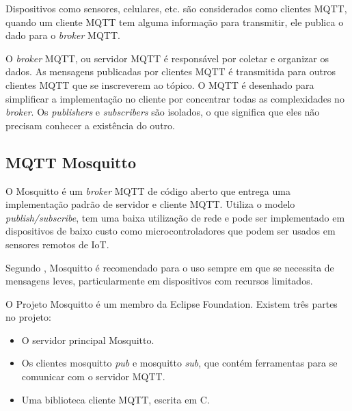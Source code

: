 Dispositivos como sensores, celulares, etc. são considerados como clientes MQTT, quando um cliente MQTT tem alguma informação para transmitir, ele publica o dado para o \textit {broker} MQTT.

O \textit {broker} MQTT, ou servidor MQTT é responsável por coletar e organizar os dados. As mensagens publicadas por clientes MQTT é transmitida para outros clientes MQTT que se inscreverem ao tópico. O MQTT é desenhado para simplificar a implementação no cliente por concentrar todas as complexidades no \textit {broker}. Os \textit {publishers} e \textit {subscribers} são isolados, o que significa que eles não precisam conhecer a existência do outro.

\subsection{MQTT Mosquitto}

O Mosquitto é um \textit{broker} MQTT de código aberto \cite{Kodali2017} que entrega uma implementação padrão de servidor e cliente MQTT. Utiliza o modelo \textit{publish/subscribe}, tem uma baixa utilização de rede e pode ser implementado em dispositivos de baixo custo como microcontroladores que podem ser usados em sensores remotos de IoT. \cite{Light}

Segundo \cite{Light}, Mosquitto é recomendado para o uso sempre em que se necessita de mensagens leves, particularmente em dispositivos com recursos limitados.

O Projeto Mosquitto é um membro da Eclipse Foundation. Existem três partes no projeto:

\begin{itemize}
	\item O servidor principal Mosquitto.
	\item Os clientes mosquitto \textit{pub} e mosquitto \textit{sub}, que contém ferramentas para se comunicar com o servidor MQTT.
	\item Uma biblioteca cliente MQTT, escrita em C.
\end{itemize}
